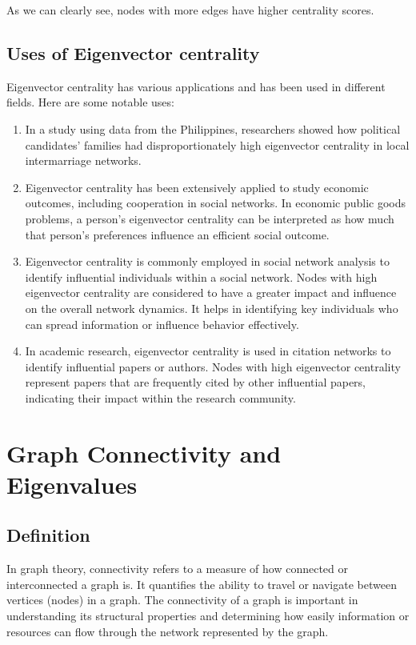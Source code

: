 \documentclass{article}
\begin{document}
    As we can clearly see, nodes with more edges have higher centrality scores.

    \subsection{Uses of Eigenvector centrality}
    Eigenvector centrality has various applications and has been used in different fields. Here are some notable uses:
    \begin{enumerate}
        \item In a study using data from the Philippines, researchers showed how political candidates' families had disproportionately high eigenvector centrality in local intermarriage networks.
        \item Eigenvector centrality has been extensively applied to study economic outcomes, including cooperation in social networks. In economic public goods problems, a person's eigenvector centrality can be interpreted as how much that person's preferences influence an efficient social outcome.
        \item Eigenvector centrality is commonly employed in social network analysis to identify influential individuals within a social network. Nodes with high eigenvector centrality are considered to have a greater impact and influence on the overall network dynamics. It helps in identifying key individuals who can spread information or influence behavior effectively.
        \item In academic research, eigenvector centrality is used in citation networks to identify influential papers or authors. Nodes with high eigenvector centrality represent papers that are frequently cited by other influential papers, indicating their impact within the research community.
    \end{enumerate}
    
\section*{Graph Connectivity and Eigenvalues}
\subsection*{Definition}
In graph theory, connectivity refers to a measure of how connected or interconnected a graph is. It quantifies the ability to travel or navigate between vertices (nodes) in a graph. The connectivity of a graph is important in understanding its structural properties and determining how easily information or resources can flow through the network represented by the graph.
\end{document}

